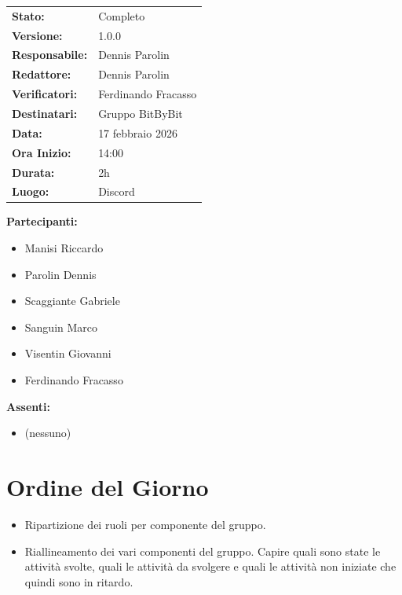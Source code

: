\documentclass[a4paper,12pt]{article}
\begin{document}
\begin{tcolorbox}
\begin{tabularx}{\textwidth}{@{}l X@{}}
\textbf{Stato:} & Completo\\
\textbf{Versione:} & 1.0.0\\
\textbf{Responsabile:} & Dennis Parolin\\
\textbf{Redattore:} & Dennis Parolin \\
\textbf{Verificatori:} & Ferdinando Fracasso\\
\textbf{Destinatari:} & Gruppo BitByBit\\
\textbf{Data:} & 17 febbraio 2026 \\
\textbf{Ora Inizio:} & 14:00 \\
\textbf{Durata:} & 2h \\
\textbf{Luogo:} & Discord \\
\end{tabularx}
\end{tcolorbox}

\vspace{0.4cm}
\textbf{Partecipanti:}
\begin{itemize}
    \item Manisi Riccardo
    \item Parolin Dennis
    \item Scaggiante Gabriele
    \item Sanguin Marco
    \item Visentin Giovanni
    \item Ferdinando Fracasso
\end{itemize}

\textbf{Assenti:}
\begin{itemize}
    \item (nessuno)
\end{itemize}

\clearpage

\vspace{0.5cm}

\vspace{0.8cm}

\clearpage
\tableofcontents
\thispagestyle{empty} %
\clearpage

\section{Ordine del Giorno}
\begin{itemize}
    \item Ripartizione dei ruoli per componente del gruppo.
    \item Riallineamento dei vari componenti del gruppo. Capire quali sono state le attività svolte, quali le attività da svolgere e quali le attività non iniziate che quindi sono in ritardo.
\end{itemize}
\end{document}

